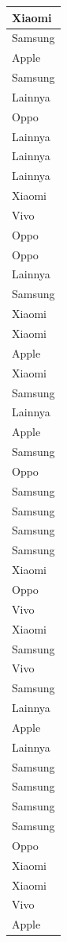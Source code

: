 \documentclass[
  letterpaper,
  DIV=11,
  numbers=noendperiod]{scrartcl}
\begin{document}
\begin{table}
\begin{tabular}[t]{l}
\hline
Xiaomi\\
\hline
Samsung\\
\hline
Apple\\
\hline
Samsung\\
\hline
Lainnya\\
\hline
Oppo\\
\hline
Lainnya\\
\hline
Lainnya\\
\hline
Lainnya\\
\hline
Xiaomi\\
\hline
Vivo\\
\hline
Oppo\\
\hline
Oppo\\
\hline
Lainnya\\
\hline
Samsung\\
\hline
Xiaomi\\
\hline
Xiaomi\\
\hline
Apple\\
\hline
Xiaomi\\
\hline
Samsung\\
\hline
Lainnya\\
\hline
Apple\\
\hline
Samsung\\
\hline
Oppo\\
\hline
Samsung\\
\hline
Samsung\\
\hline
Samsung\\
\hline
Samsung\\
\hline
Xiaomi\\
\hline
Oppo\\
\hline
Vivo\\
\hline
Xiaomi\\
\hline
Samsung\\
\hline
Vivo\\
\hline
Samsung\\
\hline
Lainnya\\
\hline
Apple\\
\hline
Lainnya\\
\hline
Samsung\\
\hline
Samsung\\
\hline
Samsung\\
\hline
Samsung\\
\hline
Oppo\\
\hline
Xiaomi\\
\hline
Xiaomi\\
\hline
Vivo\\
\hline
Apple\\

\end{tabular}
\end{table}
\end{document}
